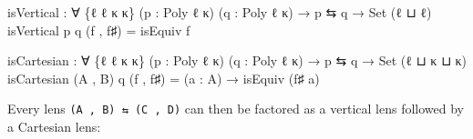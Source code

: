 \documentclass[
  11pt,
  oneside,
  article]{memoir}
\newenvironment{Shaded}{}{}
\newcommand{\DataTypeTok}[1]{\textcolor[rgb]{0.56,0.13,0.00}{#1}}
\newcommand{\NormalTok}[1]{#1}
\newcommand{\OtherTok}[1]{\textcolor[rgb]{0.00,0.44,0.13}{#1}}
\theoremstyle{definition}
\theoremstyle{plain}
\newcommand{\0}{\textsf{0}}
\newcommand{\1}{\tn{\textsf{1}}}
\begin{document}
\begin{Shaded}
\begin{Highlighting}[]
\NormalTok{isVertical }\OtherTok{:} \OtherTok{∀} \OtherTok{\{}\NormalTok{ℓ ℓ\textquotesingle{} κ κ\textquotesingle{}}\OtherTok{\}} \OtherTok{(}\NormalTok{p }\OtherTok{:}\NormalTok{ Poly ℓ κ}\OtherTok{)} \OtherTok{(}\NormalTok{q }\OtherTok{:}\NormalTok{ Poly ℓ\textquotesingle{} κ\textquotesingle{}}\OtherTok{)}
             \OtherTok{→}\NormalTok{ p ⇆ q }\OtherTok{→} \DataTypeTok{Set} \OtherTok{(}\NormalTok{ℓ ⊔ ℓ\textquotesingle{}}\OtherTok{)}
\NormalTok{isVertical p q }\OtherTok{(}\NormalTok{f , f♯}\OtherTok{)} \OtherTok{=}\NormalTok{ isEquiv f}

\NormalTok{isCartesian }\OtherTok{:} \OtherTok{∀} \OtherTok{\{}\NormalTok{ℓ ℓ\textquotesingle{} κ κ\textquotesingle{}}\OtherTok{\}} \OtherTok{(}\NormalTok{p }\OtherTok{:}\NormalTok{ Poly ℓ κ}\OtherTok{)} \OtherTok{(}\NormalTok{q }\OtherTok{:}\NormalTok{ Poly ℓ\textquotesingle{} κ\textquotesingle{}}\OtherTok{)}
             \OtherTok{→}\NormalTok{ p ⇆ q }\OtherTok{→} \DataTypeTok{Set} \OtherTok{(}\NormalTok{ℓ ⊔ κ ⊔ κ\textquotesingle{}}\OtherTok{)}
\NormalTok{isCartesian }\OtherTok{(}\NormalTok{A , B}\OtherTok{)}\NormalTok{ q }\OtherTok{(}\NormalTok{f , f♯}\OtherTok{)} \OtherTok{=} \OtherTok{(}\NormalTok{a }\OtherTok{:}\NormalTok{ A}\OtherTok{)} \OtherTok{→}\NormalTok{ isEquiv }\OtherTok{(}\NormalTok{f♯ a}\OtherTok{)}
\end{Highlighting}
\end{Shaded}

Every lens \texttt{(A\ ,\ B)\ ⇆\ (C\ ,\ D)} can then be factored as a
vertical lens followed by a Cartesian lens:
\end{document}
